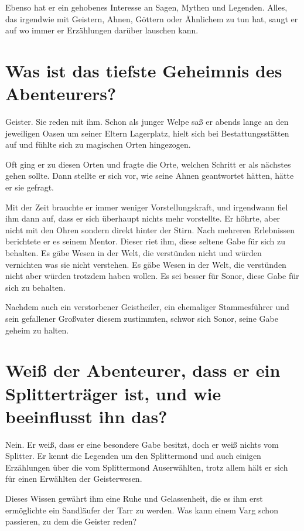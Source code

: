 \documentclass{article}
\begin{document}
	Ebenso hat er ein gehobenes Interesse an Sagen, Mythen und Legenden.
	Alles, das irgendwie mit Geistern, Ahnen, Göttern oder Ähnlichem zu tun
	hat, saugt er auf wo immer er Erzählungen darüber lauschen kann.


	\section[Top Secret]{Was ist das tiefste Geheimnis des Abenteurers?}
	

	Geister. Sie reden mit ihm. Schon als junger Welpe saß er abends lange
	an den jeweiligen Oasen um seiner Eltern Lagerplatz, hielt sich bei
	Bestattungsstätten auf und fühlte sich zu magischen Orten hingezogen.

	Oft ging er zu diesen Orten und fragte die Orte, welchen Schritt er als
	nächstes gehen sollte. Dann stellte er sich vor, wie seine Ahnen
	geantwortet hätten, hätte er sie gefragt.

	Mit der Zeit brauchte er immer weniger Vorstellungskraft, und irgendwann
	fiel ihm dann auf, dass er sich überhaupt nichts mehr vorstellte. Er
	höhrte, aber nicht mit den Ohren sondern direkt hinter der Stirn.
	Nach mehreren Erlebnissen berichtete er es seinem Mentor. Dieser riet
	ihm, diese seltene Gabe für sich zu behalten. Es gäbe Wesen in der Welt,
	die verstünden nicht und würden vernichten was sie nicht verstehen. Es
	gäbe Wesen in der Welt, die verstünden nicht aber würden trotzdem haben
	wollen. Es sei besser für Sonor, diese Gabe für sich zu behalten.

	Nachdem auch ein verstorbener Geistheiler, ein ehemaliger Stammesführer
	und sein gefallener Großvater diesem zustimmten, schwor sich Sonor,
	seine Gabe geheim zu halten.


	\section[Splitter]{Weiß der Abenteurer, dass er ein Splitterträger ist, und wie beeinflusst ihn das?}


	Nein. Er weiß, dass er eine besondere Gabe besitzt, doch er weiß nichts
	vom Splitter. Er kennt die Legenden um den Splittermond und auch einigen
	Erzählungen über die vom Splittermond Auserwählten, trotz allem hält er
	sich für einen Erwählten der Geisterwesen.

	Dieses Wissen gewährt ihm eine Ruhe und Gelassenheit, die es ihm erst
	ermöglichte ein Sandläufer der Tarr zu werden.
	Was kann einem Varg schon passieren, zu dem die Geister reden?
\end{document}
